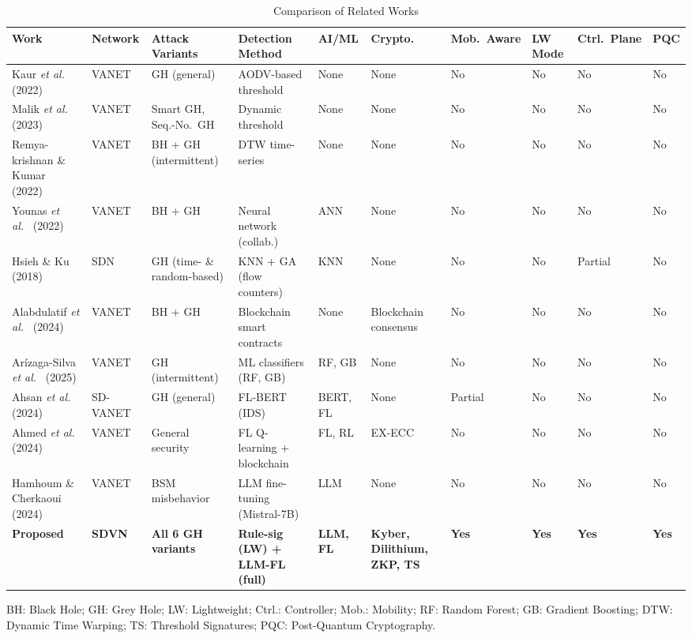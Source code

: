 \documentclass[12pt, a4paper]{report}
\begin{document}
\begin{table}[!t]
\renewcommand{\arraystretch}{1.3}
\caption{Comparison of Related Works}
\label{tab:relatedwork}
\centering
\scriptsize
\begin{tabular}{|p{2.1cm}|p{1.1cm}|p{1.5cm}|p{1.4cm}|p{1.2cm}|p{1.2cm}|p{0.9cm}|p{0.9cm}|p{0.85cm}|p{0.9cm}|}
\hline
\textbf{Work} & \textbf{Network} & \textbf{Attack Variants} &
\textbf{Detection Method} & \textbf{AI/ML} & \textbf{Crypto.} &
\textbf{Mob.\ Aware} & \textbf{LW Mode} &
\textbf{Ctrl.\ Plane} & \textbf{PQC} \\
\hline
Kaur \textit{et al.}~\cite{kaur2022greyhole} (2022) &
VANET & GH (general) & AODV-based threshold & None & None & No & No & No & No \\
\hline
Malik \textit{et al.}~\cite{malik2023greyhole} (2023) &
VANET & Smart GH, Seq.-No.\ GH & Dynamic threshold & None & None & No & No & No & No \\
\hline
Remya-krishnan \& Kumar~\cite{remyakrishnan2022dtw} (2022) &
VANET & BH + GH (intermittent) & DTW time-series & None & None & No & No & No & No \\
\hline
Younas \textit{et al.}~\cite{younas2022collaborative} (2022) &
VANET & BH + GH & Neural network (collab.) & ANN & None & No & No & No & No \\
\hline
Hsieh \& Ku~\cite{hsieh2018sdn} (2018) &
SDN & GH (time- \& random-based) & KNN + GA (flow counters) & KNN & None & No & No & Partial & No \\
\hline
Alabdulatif \textit{et al.}~\cite{alabdulatif2024mitigating} (2024) &
VANET & BH + GH & Blockchain smart contracts & None & Blockchain consensus & No & No & No & No \\
\hline
Arízaga-Silva \textit{et al.}~\cite{arizagasilva2025ml} (2025) &
VANET & GH (intermittent) & ML classifiers (RF, GB) & RF, GB & None & No & No & No & No \\
\hline
Ahsan \textit{et al.}~\cite{ahsan2024flbert} (2024) &
SD-VANET & GH (general) & FL-BERT (IDS) & BERT, FL & None & Partial & No & No & No \\
\hline
Ahmed \textit{et al.}~\cite{ahmed2024blockchain} (2024) &
VANET & General security & FL Q-learning + blockchain & FL, RL & EX-ECC & No & No & No & No \\
\hline
Hamhoum \& Cherkaoui~\cite{hamhoum2024mistralbsm} (2024) &
VANET & BSM misbehavior & LLM fine-tuning (Mistral-7B) & LLM & None & No & No & No & No \\
\hline
\textbf{Proposed} & \textbf{SDVN} &
\textbf{All 6 GH variants} &
\textbf{Rule-sig (LW) + LLM-FL (full)} &
\textbf{LLM, FL} &
\textbf{Kyber, Dilithium, ZKP, TS} &
\textbf{Yes} & \textbf{Yes} & \textbf{Yes} & \textbf{Yes} \\
\hline
\end{tabular}
\vspace{1mm}
\footnotesize{BH: Black Hole; GH: Grey Hole; LW: Lightweight; Ctrl.: Controller;
Mob.: Mobility; RF: Random Forest; GB: Gradient Boosting; DTW: Dynamic Time
Warping; TS: Threshold Signatures; PQC: Post-Quantum Cryptography.}
\end{table}
\end{document}
